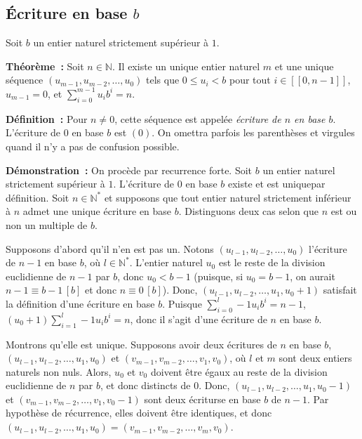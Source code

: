 \subsection{Écriture en base \texorpdfstring{$b$}{b}}
\label{sub:base}

Soit $b$ un entier naturel strictement supérieur à $1$. 

\bigskip 

\noindent\textbf{Théorème :} Soit $n \in \mathbb{N}$. Il existe un unique entier naturel $m$ et une unique séquence $(u_{m-1}, u_{m-2}, \dots, u_0)$ tels que $0 \leq u_i < b$ pour tout $i \in [\![0,n-1]\!]$, $u_{m-1} = 0$, et $\sum_{i=0}^{m-1} u_i b^{i} = n$. 

\medskip 

\noindent\textbf{Définition :} Pour $n \neq 0$, cette séquence est appelée \textit{écriture de $n$ en base $b$}. L'écriture de $0$ en base $b$ est $(0)$. On omettra parfois les parenthèses et virgules quand il n'y a pas de confusion possible. 

\medskip

\noindent\textbf{Démonstration :} 
On procède par recurrence forte. 
Soit $b$ un entier naturel strictement supérieur à $1$. 
L'écriture de $0$ en base $b$ existe et est uniquepar définition. 
Soit $n \in \mathbb{N}^*$ et supposons que tout entier naturel strictement inférieur à $n$ admet une unique écriture en base $b$. 
Distinguons deux cas selon que $n$ est ou non un multiple de $b$. 

Supposons d'abord qu'il n'en est pas un. 
Notons $(u_{l-1}, u_{l-2}, \dots, u_0)$ l'écriture de $n-1$ en base $b$, où $l \in \mathbb{N}^*$. 
L'entier naturel $u_0$ est le reste de la division euclidienne de $n-1$ par $b$, donc $u_0 < b-1$ (puisque, si $u_0 = b-1$, on aurait $n-1 \equiv b-1 \, [b]$ et donc $n \equiv 0 \, [b]$). 
Donc, $(u_{l-1}, u_{l-2}, \dots, u_1, u_0+1)$ satisfait la définition d'une écriture en base $b$. 
Puisque $\sum_{i=0}^l-1 u_i b^i = n-1$, $ (u_0 + 1) \sum_{i=1}^l-1 u_i b^i = n$, donc il s'agit d'une écriture de $n$ en base $b$. 

Montrons qu'elle est unique. 
Supposons avoir deux écritures de $n$ en base $b$, $(u_{l-1}, u_{l-2}, \dots, u_1, u_0)$ et $(v_{m-1}, v_{m-2}, \dots, v_1, v_0)$, où $l$ et $m$ sont deux entiers naturels non nuls. 
Alors, $u_0$ et $v_0$ doivent être égaux au reste de la division euclidienne de $n$ par $b$, et donc distincts de $0$. 
Donc, $(u_{l-1}, u_{l-2}, \dots, u_1, u_0-1)$ et $(v_{m-1}, v_{m-2}, \dots, v_1, v_0-1)$ sont deux écriturse en base $b$ de $n-1$. 
Par hypothèse de récurrence, elles doivent être identiques, et donc $(u_{l-1}, u_{l-2}, \dots, u_1, u_0) = (v_{m-1}, v_{m-2}, \dots, v_m, v_0)$. 

